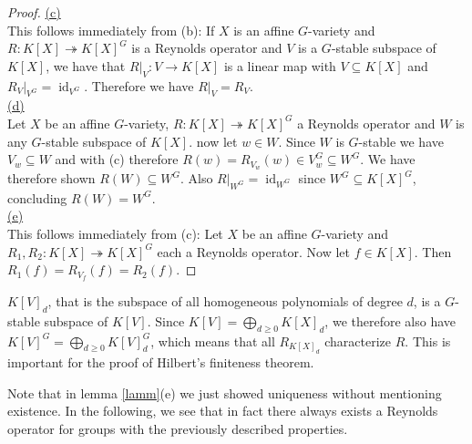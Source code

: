 \begin{proof}
  \underline{(c)}\\
  This follows immediately from (b):
  If $X$ is an affine $G$-variety and $R \colon K[X] \twoheadrightarrow K[X]^G$ is a Reynolds operator and $V$ is a $G$-stable subspace of $K[X]$, we have that $\left. R \right|_V \colon V \longrightarrow K[X]$ is a linear map with $V \subseteq K[X]$ and $\left. R_V \right|_{V^G} = \operatorname{id}_{V^G}$.
  Therefore we have $\left. R \right|_V = R_V$.  \\
  \underline{(d)}\\
  Let $X$ be an affine $G$-variety, $R \colon K[X] \twoheadrightarrow K[X]^G$ a Reynolds operator and $W$ is any $G$-stable subspace of $K[X]$.
  now let $w \in W$.
  Since $W$ is $G$-stable we have $V_w \subseteq W$ and with (c) therefore $R(w) = R_{V_w} (w) \in V_w^G \subseteq W^G$.
  We have therefore shown $R(W) \subseteq W^G$.
  Also $\left. R \right|_{W^G} = \operatorname{id}_{W^G}$ since $W^G \subseteq K[X]^G$, concluding $R(W) = W^G$.  \\
  \underline{(e)}\\
  This follows immediately from (c):
  Let $X$ be an affine $G$-variety and $R_1,R_2 \colon K[X] \twoheadrightarrow K[X]^G$ each a Reynolds operator.
  Now let $f \in K[X]$.
  Then $R_1(f) = R_{V_f} (f) = R_2 (f)$.
\end{proof}

\begin{remark}
  $K[V]_d$, that is the subspace of all homogeneous polynomials of degree $d$, is a $G$-stable subspace of $K[V]$.
  Since $K[V] = \bigoplus_{d \geq 0} K[X]_d$, we therefore also have $K[V]^G = \bigoplus_{d \geq 0} K[V]_d^G$, which means that all $R_{K[X]_d}$ characterize $R$.
  This is important for the proof of Hilbert's finiteness theorem.
\end{remark}

\begin{remark}
  Note that in lemma \ref{lamm}(e) we just showed uniqueness without mentioning existence.
  In the following, we see that in fact there always exists a Reynolds operator for groups with the previously described properties.
\end{remark}



